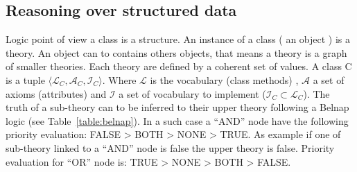 \documentclass{llncs}
\begin{document}
\subsection{Reasoning over structured data}
Logic point of view a class is a structure. An instance of a class ( an object ) is a theory. An object can to contains others objects, that means a theory is a graph of smaller theories. Each theory are defined by a coherent set of values. A class C is a tuple \( \langle \mathcal{L}_{C}, \mathcal{A}_{C} , \mathcal{I}_{C} \rangle \). Where  \(\mathcal{L} \) is the vocabulary (class methods) ,  \(\mathcal{A} \)  a set of axioms (attributes) and \(\mathcal{I} \) a set of vocabulary to implement (\( \mathcal{I}_{C} \subset\mathcal{L}_{C} \)). The truth of a sub-theory can to be inferred to their upper theory following a Belnap logic (see Table~\ref{table:belnap}). In a such case a ``AND'' node have the following priority evaluation: FALSE > BOTH > NONE > TRUE. As example if one of sub-theory linked to a ``AND'' node is false the upper theory is false. Priority evaluation for ``OR'' node is: TRUE > NONE > BOTH > FALSE.
    
\end{document}

